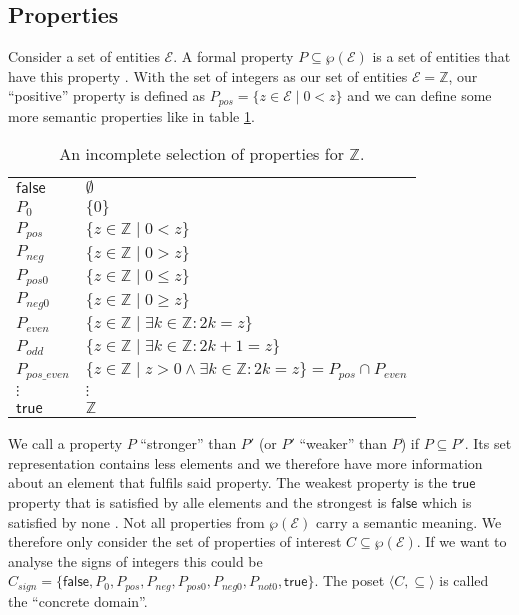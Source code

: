 \subsection{Properties}

Consider a set of entities $\mathcal{E}$. A formal property $P\subseteq \wp(\mathcal{E}) $ is a set of entities that have this property \cite[chapter 8]{cousot2021}. With the set of integers as our set of entities $\mathcal{E}=\mathbb{Z}$, our ``positive'' property is defined as $P_{pos}=\{z\in \mathcal{E} \;|\; 0<z\}$ and we can define some more semantic properties like in table \ref{table:properties}.
\begin{table}[hbt]
\begin{center}
  \begin{tabular}{l|l}
  $\mathsf{false}$ & $\emptyset$\\
   $P_{0}$ & $\{0\}$\\
   $P_{pos}$ & $\{z\in \mathbb{Z} \;|\; 0<z\}$\\
   $P_{neg}$ & $\{z\in \mathbb{Z} \;|\; 0>z\}$\\
   $P_{pos0}$ & $\{z\in \mathbb{Z} \;|\; 0\leq z\}$\\
   $P_{neg0}$ & $\{z\in \mathbb{Z} \;|\; 0\geq z\}$\\
   $P_{even}$ & $\{z\in \mathbb{Z} \;|\; \exists k\in\mathbb{Z}:2k=z \}$ \\
   $P_{odd}$ & $\{z\in \mathbb{Z} \;|\; \exists k\in\mathbb{Z}:2k+1=z \}$ \\
   $P_{pos\_even}$ & $\{z\in \mathbb{Z} \;|\; z>0 \wedge \exists k\in\mathbb{Z}:2k=z \} = P_{pos} \cap P_{even}$ \\
   $\vdots$ &$\vdots$\\
   $\mathsf{true}$ & $\mathbb{Z}$\\
  \end{tabular}
  \caption{An incomplete selection of properties for $\mathbb{Z}$.}\label{table:properties}
  \end{center}
\end{table}

We call a property $P$ ``stronger'' than $P'$ (or $P'$ ``weaker'' than $P$) if $P\subseteq P'$. Its set representation contains less elements and we therefore have more information about an element that fulfils said property. The weakest property is the $\mathsf{true}$ property that is satisfied by alle elements and the strongest is $\mathsf{false}$ which is satisfied by none \cite[chapter 8]{cousot2021}. Not all properties from $\wp(\mathcal{E})$ carry a semantic meaning. We therefore only consider the set of properties of interest $C\subseteq\wp(\mathcal{E})$. If we want to analyse the signs of integers this could be $C_{sign}=\{\mathsf{false}, P_{0}, P_{pos}, P_{neg}, P_{pos0}, P_{neg0}, P_{not0}, \mathsf{true}\}$. The poset  $\langle C,\subseteq\rangle$ is called the ``concrete domain''.

